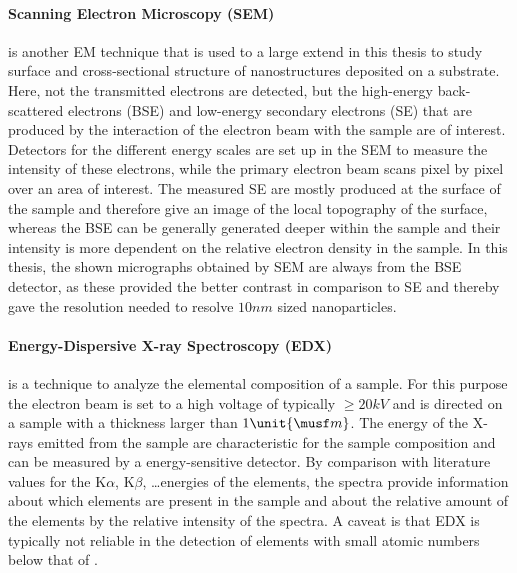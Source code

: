 \documentclass[\main/dresen_thesis.tex]{subfiles}
\begin{document}
    \paragraph{Scanning Electron Microscopy (SEM)}
      is another EM technique that is used to a large extend in this thesis to study surface and cross-sectional structure of nanostructures deposited on a substrate.
      Here, not the transmitted electrons are detected, but the high-energy back-scattered electrons (BSE) and low-energy secondary electrons (SE) that are produced by the interaction of the electron beam with the sample are of interest.
      Detectors for the different energy scales are set up in the SEM to measure the intensity of these electrons, while the primary electron beam scans pixel by pixel over an area of interest.
      The measured SE are mostly produced at the surface of the sample and therefore give an image of the local topography of the surface, whereas the BSE can be generally generated deeper within the sample and their intensity is more dependent on the relative electron density in the sample.
      In this thesis, the shown micrographs obtained by SEM are always from the BSE detector, as these provided the better contrast in comparison to SE and thereby gave the resolution needed to resolve $10 \unit{nm}$ sized nanoparticles.

    \paragraph{Energy-Dispersive X-ray Spectroscopy (EDX)}
      is a technique to analyze the elemental composition of a sample.
      For this purpose the electron beam is set to a high voltage of typically $\geq 20 \unit{kV}$ and is directed on a sample with a thickness larger than $1 \unit{\musf m}$.
      The energy of the X-rays emitted from the sample are characteristic for the sample composition and can be measured by a energy-sensitive detector.
      By comparison with literature values for the K$\alpha$, K$\beta$, \ldots energies of the elements, the spectra provide information about which elements are present in the sample and about the relative amount of the elements by the relative intensity of the spectra.
      A caveat is that EDX is typically not reliable in the detection of elements with small atomic numbers below that of .
\end{document}
